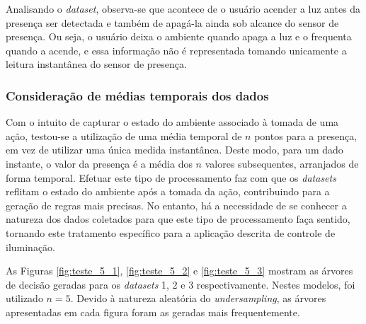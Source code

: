Analisando o \textit{dataset}, observa-se que acontece de o usuário acender a luz antes da presença ser detectada e também de apagá-la ainda sob alcance do sensor de presença. Ou seja, o usuário deixa o ambiente quando apaga a luz e o frequenta quando a acende, e essa informação não é representada tomando unicamente a leitura instantânea do sensor de presença.

\clearpage

\subsubsection{Consideração de médias temporais dos dados}
Com o intuito de capturar o estado do ambiente associado à tomada de uma ação, testou-se a utilização de uma média temporal de $n$ pontos para a presença, em vez de utilizar uma única medida instantânea. Deste modo, para um dado instante, o valor da presença é a média dos $n$ valores subsequentes, arranjados de forma temporal. Efetuar este tipo de processamento faz com que os \textit{datasets} reflitam o estado do ambiente após a tomada da ação, contribuindo para a geração de regras mais precisas. No entanto, há a necessidade de se conhecer a natureza dos dados coletados para que este tipo de processamento faça sentido, tornando este tratamento específico para a aplicação descrita de controle de iluminação.

As Figuras \ref{fig:teste_5_1}, \ref{fig:teste_5_2} e \ref{fig:teste_5_3} mostram as árvores de decisão geradas para os \textit{datasets} 1, 2 e 3 respectivamente. Nestes modelos, foi utilizado $n=5$. Devido à natureza aleatória do \textit{undersampling}, as árvores apresentadas em cada figura foram as geradas mais frequentemente.


